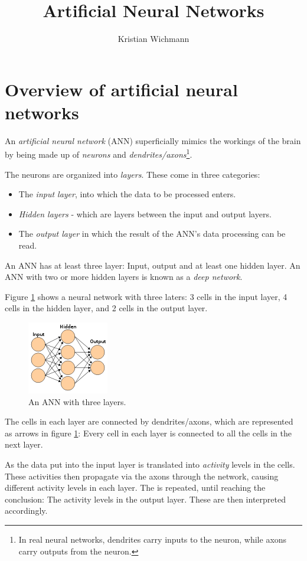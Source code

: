 \documentclass[12pt, a4paper]{article}
\title{Artificial Neural Networks}
\author{Kristian Wichmann}
\numberwithin{equation}{section}
\begin{document}
\maketitle

\section{Overview of artificial neural networks}
An \textit{artificial neural network} (ANN) superficially mimics the workings of the brain by being made up of \textit{neurons} and \textit{dendrites/axons}\footnote{In real neural networks, dendrites carry inputs to the neuron, while axons carry outputs from the neuron.}.

The neurons are organized into \textit{layers}. These come in three categories:
\begin{itemize}
\item The \textit{input layer}, into which the data to be processed enters.
\item \textit{Hidden layers} - which are layers between the input and output layers.
\item The \textit{output layer} in which the result of the ANN's data processing can be read.
\end{itemize}

An ANN has at least three layer: Input, output and at least one hidden layer. An ANN with two or more hidden layers is known as a \textit{deep network}. 

Figure \ref{fig:ann_example} shows a neural network with three laters: 3 cells in the input layer, 4 cells in the hidden layer, and 2 cells in the output layer.

\begin{figure}
\centering
\includegraphics{artificial_neural_network}
\caption{An ANN with three layers.}
\label{fig:ann_example}
\end{figure}

The cells in each layer are connected by dendrites/axons, which are represented as arrows in figure \ref{fig:ann_example}: Every cell in each layer is connected to all the cells in the next layer.

As the data put into the input layer is translated into \textit{activity} levels in the cells. These activities then propagate via the axons through the network, causing different activity levels in each layer. The is repeated, until reaching the conclusion: The activity levels in the output layer. These are then interpreted accordingly.
\end{document}
